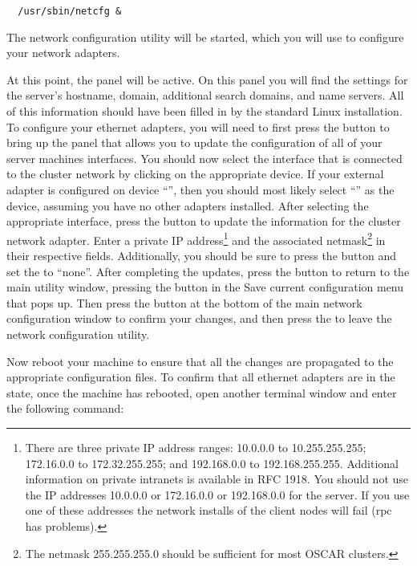 \begin{verbatim}
  /usr/sbin/netcfg &
\end{verbatim}
  
The network configuration utility will be started, which you will use
to configure your network adapters.
  
At this point, the  panel will be active. On this panel
you will find the settings for the server's hostname, domain,
additional search domains, and name servers. All of this information
should have been filled in by the standard Linux installation. To
configure your ethernet adapters, you will need to first press the
 button to bring up the panel that allows you to
update the configuration of all of your server machines interfaces.
You should now select the interface that is connected to the cluster
network by clicking on the appropriate device. If your external
adapter is configured on device ``'', then you should most
likely select ``'' as the device, assuming you have no
other adapters installed. After selecting the appropriate interface,
press the  button to update the information for the
cluster network adapter. Enter a private IP address\footnote { There
  are three private IP address ranges: 10.0.0.0 to 10.255.255.255;
  172.16.0.0 to 172.32.255.255; and 192.168.0.0 to 192.168.255.255.
  Additional information on private intranets is available in RFC
  1918.  You should not use the IP addresses 10.0.0.0 or 172.16.0.0 or
  192.168.0.0 for the server.  If you use one of these addresses the
  network installs of the client nodes will fail (rpc has problems).
  } and the associated netmask\footnote{The netmask 255.255.255.0
  should be sufficient for most OSCAR clusters.}  in their respective
fields. Additionally, you should be sure to press the  button and set the  to ``none''.  After completing the updates,
press the  button to return to the main utility window,
pressing the  button in the Save current configuration
menu that pops up.  Then press the  button at the bottom
of the main network configuration window to confirm your changes, and
then press the  to leave the network configuration
utility.
  
Now reboot your machine to ensure that all the changes are propagated
to the appropriate configuration files. To confirm that all ethernet
adapters are in the  state, once the machine has rebooted,
open another terminal window and enter the following command:


